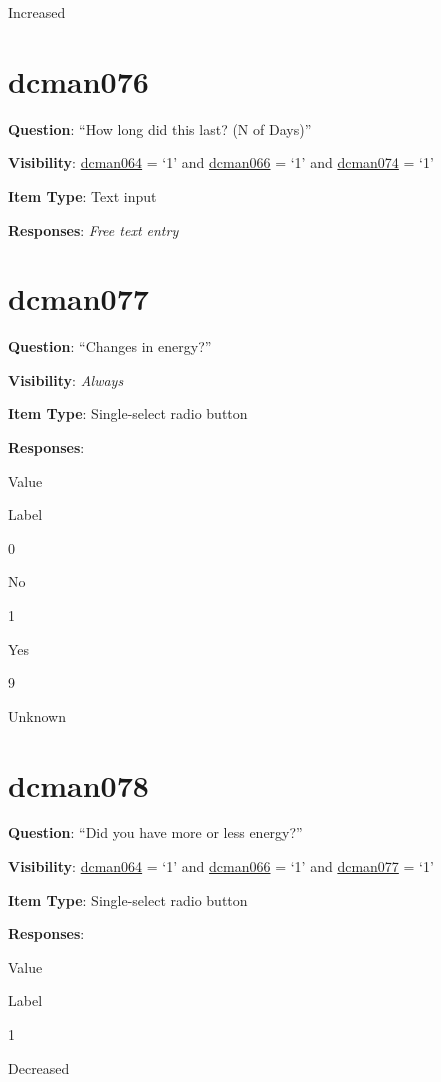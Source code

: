 \documentclass[]{book}
\begin{document}
Increased

\hypertarget{dcman076}{%
\section{dcman076}\label{dcman076}}

\textbf{Question}: ``How long did this last? (N of Days)''

\textbf{Visibility}: \protect\hyperlink{dcman064}{dcman064} = `1' and \protect\hyperlink{dcman066}{dcman066} = `1' and \protect\hyperlink{dcman074}{dcman074} = `1'

\textbf{Item Type}: Text input

\textbf{Responses}: \emph{Free text entry}

\hypertarget{dcman077}{%
\section{dcman077}\label{dcman077}}

\textbf{Question}: ``Changes in energy?''

\textbf{Visibility}: \emph{Always}

\textbf{Item Type}: Single-select radio button

\textbf{Responses}:

Value

Label

0

No

1

Yes

9

Unknown

\hypertarget{dcman078}{%
\section{dcman078}\label{dcman078}}

\textbf{Question}: ``Did you have more or less energy?''

\textbf{Visibility}: \protect\hyperlink{dcman064}{dcman064} = `1' and \protect\hyperlink{dcman066}{dcman066} = `1' and \protect\hyperlink{dcman077}{dcman077} = `1'

\textbf{Item Type}: Single-select radio button

\textbf{Responses}:

Value

Label

1

Decreased
\end{document}
